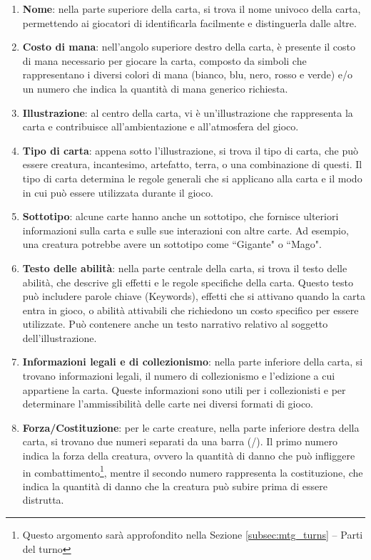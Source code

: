 \begin{enumerate}[label=\alph*.]
    \item \textbf{Nome}: nella parte superiore della carta, si trova il nome univoco della carta, permettendo ai giocatori di identificarla facilmente e distinguerla dalle altre. 
    
    \item \textbf{Costo di mana}: nell'angolo superiore destro della carta, è presente il costo di mana necessario per giocare la carta, composto da simboli che rappresentano i diversi colori di mana (bianco, blu, nero, rosso e verde) e/o un numero che indica la quantità di mana generico richiesta.
    
    \item \textbf{Illustrazione}: al centro della carta, vi è un'illustrazione che rappresenta la carta e contribuisce all'ambientazione e all'atmosfera del gioco. 
    
    \item \textbf{Tipo di carta}: appena sotto l'illustrazione, si trova il tipo di carta, che può essere creatura, incantesimo, artefatto, terra, o una combinazione di questi. Il tipo di carta determina le regole generali che si applicano alla carta e il modo in cui può essere utilizzata durante il gioco. 
    
    \item \textbf{Sottotipo}: alcune carte hanno anche un sottotipo, che fornisce ulteriori informazioni sulla carta e sulle sue interazioni con altre carte. Ad esempio, una creatura potrebbe avere un sottotipo come ``Gigante" o ``Mago". 
    
    \item \textbf{Testo delle abilità}: nella parte centrale della carta, si trova il testo delle abilità, che descrive gli effetti e le regole specifiche della carta. Questo testo può includere parole chiave (Keywords), effetti che si attivano quando la carta entra in gioco, o abilità attivabili che richiedono un costo specifico per essere utilizzate. Può contenere anche un testo narrativo relativo al soggetto dell'illustrazione.
    
    \item \textbf{Informazioni legali e di collezionismo}: nella parte inferiore della carta, si trovano informazioni legali, il numero di collezionismo e l'edizione a cui appartiene la carta. Queste informazioni sono utili per i collezionisti e per determinare l'ammissibilità delle carte nei diversi formati di gioco. 
    
    \item \textbf{Forza/Costituzione}: per le carte creature, nella parte inferiore destra della carta, si trovano due numeri separati da una barra (/). Il primo numero indica la forza della creatura, ovvero la quantità di danno che può infliggere in combattimento\footnote{Questo argomento sarà approfondito nella Sezione \ref{subsec:mtg_turns} -- Parti del turno}, mentre il secondo numero rappresenta la costituzione, che indica la quantità di danno che la creatura può subire prima di essere distrutta.     
\end{enumerate}


